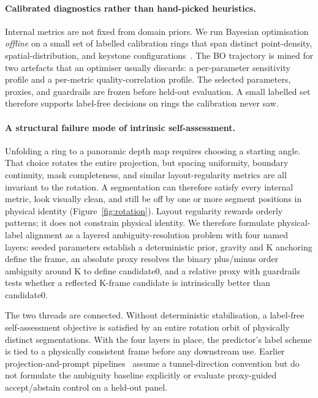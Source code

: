 \documentclass[a4paper,fleqn]{cas-dc}
\begin{document}
\paragraph{Calibrated diagnostics rather than hand-picked heuristics.}
Internal metrics are not fixed from domain priors. We run Bayesian optimisation \emph{offline} on a small set of labelled calibration rings that span distinct point-density, spatial-distribution, and keystone configurations~\cite{jones1998ego,shahriari2016reviewBO}. The BO trajectory is mined for two artefacts that an optimiser usually discards: a per-parameter sensitivity profile and a per-metric quality-correlation profile. The selected parameters, proxies, and guardrails are frozen before held-out evaluation. A small labelled set therefore supports label-free decisions on rings the calibration never saw.

\paragraph{A structural failure mode of intrinsic self-assessment.}
Unfolding a ring to a panoramic depth map requires choosing a starting angle. That choice rotates the entire projection, but spacing uniformity, boundary continuity, mask completeness, and similar layout-regularity metrics are all invariant to the rotation. A segmentation can therefore satisfy every internal metric, look visually clean, and still be off by one or more segment positions in physical identity (Figure~\ref{fig:rotation}). Layout regularity rewards orderly patterns; it does not constrain physical identity. We therefore formulate physical-label alignment as a layered ambiguity-resolution problem with four named layers: seeded parameters establish a deterministic prior, gravity and K anchoring define the frame, an absolute proxy resolves the binary plus/minus order ambiguity around K to define candidate0, and a relative proxy with guardrails tests whether a reflected K-frame candidate is intrinsically better than candidate0.

The two threads are connected. Without deterministic stabilisation, a label-free self-assessment objective is satisfied by an entire rotation orbit of physically distinct segmentations. With the four layers in place, the predictor's label scheme is tied to a physically consistent frame before any downstream use. Earlier projection-and-prompt pipelines~\cite{ye2025sam4tun} assume a tunnel-direction convention but do not formulate the ambiguity baseline explicitly or evaluate proxy-guided accept/abstain control on a held-out panel.
\end{document}
